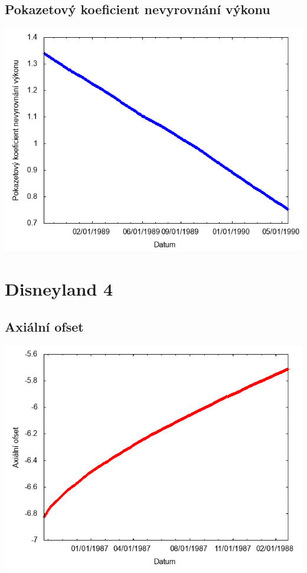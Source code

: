 \documentclass[a4paper,twoside,11pt]{article}
\begin{document}
\subsection*{Pokazetový koeficient nevyrovnání výkonu}
\begin{center}
\includegraphics[width=.8\textwidth]{graphs/Disneyland_03_fha.png}
\end{center}

\newpage
\section*{Disneyland 4}
\subsection*{Axiální ofset}
\begin{center}
\includegraphics[width=.8\textwidth]{graphs/Disneyland_04_ao.png}
\end{center}
\end{document}
